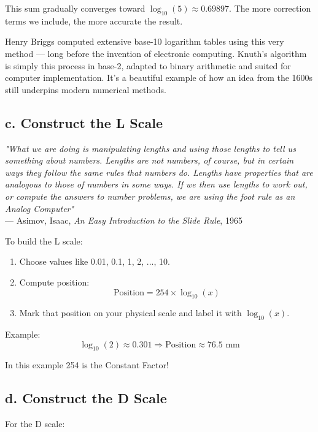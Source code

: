 \documentclass[10pt,twocolumn]{article}
\begin{document}
This sum gradually converges toward \( \log_{10}(5) \approx 0.69897 \). The more correction terms we include, the more accurate the result.

Henry Briggs computed extensive base-10 logarithm tables using this very method — long before the invention of electronic computing. Knuth’s algorithm is simply this process in base-2, adapted to binary arithmetic and suited for computer implementation. It’s a beautiful example of how an idea from the 1600s still underpins modern numerical methods.

\subsection*{c. Construct the L Scale}

\begin{center}
\textit{"What we are doing is manipulating lengths and using those lengths to tell us something about numbers. Lengths are not numbers, of course, but in certain ways they follow the same rules that numbers do. Lengths have properties that are analogous to those of numbers in some ways. If we then use lengths to work out, or compute the answers to number problems, we are using the foot rule as an Analog Computer"} \\
\hfill --- Asimov, Isaac, \textit{An Easy Introduction to the Slide Rule}, 1965 \\[0.4em]
\end{center}

To build the L scale:

\begin{enumerate}
  \item Choose values like 0.01, 0.1, 1, 2, ..., 10.
  \item Compute position: \[ \text{Position} = 254 \times \log_{10}(x) \]
  \item Mark that position on your physical scale and label it with $\log_{10}(x)$.
\end{enumerate}

Example:
\[
\log_{10}(2) \approx 0.301 \Rightarrow \text{Position} \approx 76.5 \text{ mm}
\]

In this example 254 is the Constant Factor!

\subsection*{d. Construct the D Scale}

For the D scale:
\end{document}
